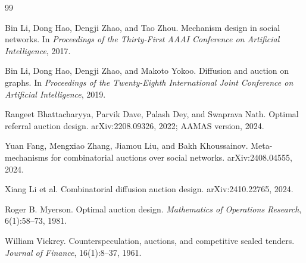 \documentclass[11pt]{article}
\begin{document}
\begin{thebibliography}{99}

Bin Li, Dong Hao, Dengji Zhao, and Tao Zhou.
\newblock Mechanism design in social networks.
\newblock In \emph{Proceedings of the Thirty-First AAAI Conference on Artificial Intelligence}, 2017.

Bin Li, Dong Hao, Dengji Zhao, and Makoto Yokoo.
\newblock Diffusion and auction on graphs.
\newblock In \emph{Proceedings of the Twenty-Eighth International Joint Conference on Artificial Intelligence}, 2019.

Rangeet Bhattacharyya, Parvik Dave, Palash Dey, and Swaprava Nath.
\newblock Optimal referral auction design.
\newblock arXiv:2208.09326, 2022; AAMAS version, 2024.

Yuan Fang, Mengxiao Zhang, Jiamou Liu, and Bakh Khoussainov.
\newblock Meta-mechanisms for combinatorial auctions over social networks.
\newblock arXiv:2408.04555, 2024.

Xiang Li et al.
\newblock Combinatorial diffusion auction design.
\newblock arXiv:2410.22765, 2024.

Roger B. Myerson.
\newblock Optimal auction design.
\newblock \emph{Mathematics of Operations Research}, 6(1):58--73, 1981.

William Vickrey.
\newblock Counterspeculation, auctions, and competitive sealed tenders.
\newblock \emph{Journal of Finance}, 16(1):8--37, 1961.

\end{thebibliography}
\end{document}
